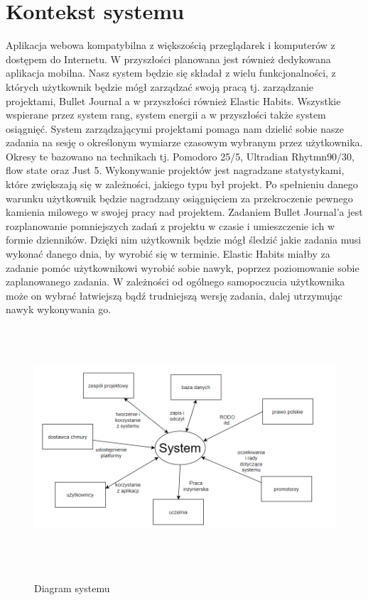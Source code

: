 \documentclass[a4paper,11pt]{report}
\begin{document}
\section {Kontekst systemu}
Aplikacja webowa kompatybilna z większością przeglądarek i komputerów z dostępem do Internetu.
W przyszłości planowana jest również dedykowana aplikacja mobilna.
 Nasz system będzie się składał z wielu funkcjonalności,
 z których użytkownik będzie mógł zarządzać swoją pracą tj. zarządzanie projektami,
 Bullet Journal a w przyszłości również Elastic Habits\cite{elastic}\cite{elasticHabits}.
 Wszystkie wspierane przez system rang, system energii a w przyszłości także system osiągnięć.
 System zarządzającymi projektami pomaga nam dzielić sobie nasze zadania na sesję o określonym wymiarze
 czasowym wybranym przez użytkownika.
 Okresy te bazowano na technikach tj. Pomodoro\cite{Pomodoro} 25/5, Ultradian Rhytmn\cite{90/30}90/30,
 flow state\cite{flow}\cite{flowState} oraz Just 5\cite{just5}\cite{just5_}.
 Wykonywanie projektów jest nagradzane statystykami, które zwiększają się w zależności, jakiego typu był projekt.
 Po spełnieniu danego warunku użytkownik będzie nagradzany osiągnięciem za przekroczenie pewnego kamienia milowego
 w swojej pracy nad projektem.
 Zadaniem Bullet Journal’a jest rozplanowanie pomniejszych zadań z projektu w czasie i umieszczenie ich w formie dzienników.
 Dzięki nim użytkownik będzie mógł śledzić jakie zadania musi wykonać danego dnia, by wyrobić się w terminie.
 Elastic Habits miałby za zadanie pomóc użytkownikowi wyrobić sobie nawyk,
 poprzez poziomowanie sobie zaplanowanego zadania.
 W zależności od ogólnego samopoczucia użytkownika może on wybrać łatwiejszą bądź trudniejszą wersję zadania, dalej utrzymując nawyk wykonywania go. \\

\begin{figure}[h]
	\centering
	\includegraphics[width=\textwidth, height=9cm]{system}\\
	\caption{Diagram systemu}
	\label{fig:system}
\end{figure}
\end{document}
